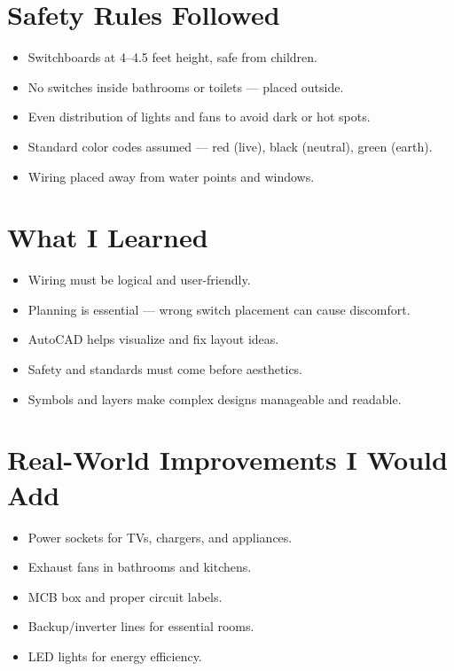 \documentclass[12pt]{article}
\begin{document}
\section*{Safety Rules Followed}
\begin{itemize}
    \item Switchboards at 4–4.5 feet height, safe from children.
    \item No switches inside bathrooms or toilets — placed outside.
    \item Even distribution of lights and fans to avoid dark or hot spots.
    \item Standard color codes assumed — red (live), black (neutral), green (earth).
    \item Wiring placed away from water points and windows.
\end{itemize}

\section*{What I Learned}
\begin{itemize}
    \item Wiring must be logical and user-friendly.
    \item Planning is essential — wrong switch placement can cause discomfort.
    \item AutoCAD helps visualize and fix layout ideas.
    \item Safety and standards must come before aesthetics.
    \item Symbols and layers make complex designs manageable and readable.
\end{itemize}

\section*{Real-World Improvements I Would Add}
\begin{itemize}
    \item Power sockets for TVs, chargers, and appliances.
    \item Exhaust fans in bathrooms and kitchens.
    \item MCB box and proper circuit labels.
    \item Backup/inverter lines for essential rooms.
    \item LED lights for energy efficiency.
\end{itemize}
\newpage
\end{document}
